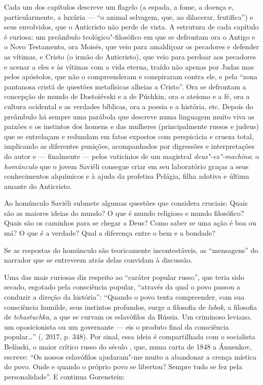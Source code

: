 Cada um dos capítulos descreve um flagelo (a espada, a fome, a doença e,
particularmente, a luxúria --- ``o animal selvagem, que, ao dilacerar,
frutifica'') e seus envolvidos, que o Anticristo não perde de vista. A
estrutura de cada capítulo é curiosa: um preâmbulo teológico"-filosófico
em que se defrontam ora o Antigo e o Novo Testamento, ora Moisés, que
veio para amaldiçoar os pecadores e defender as vítimas, e Cristo (o
irmão do Anticristo), que veio para perdoar aos pecadores e acenar a
eles e às vítimas com a vida eterna, traído não apenas por Judas mas
pelos apóstolos, que não o compreenderam e conspiraram contra ele, e pela
``zona pantanosa cristã de questões metafísicas alheias a Cristo''. Ora se
defrontam a concepção de mundo de Dostoiévski e a de Púchkin, ora o ateísmo e a fé,
ora a cultura ocidental e as verdades bíblicas, ora a poesia e a
história, etc. Depois do preâmbulo há sempre uma parábola que descreve
numa linguagem muito viva as paixões e os instintos dos homens e das
mulheres (principalmente russos e judeus) que se entrelaçam e redundam
em fatos expostos com perspicácia e crueza total, implicando as
diferentes punições, acompanhados por digressões e interpretações do
autor e --- finalmente --- pelos vaticínios de um magistral \emph{deus"-ex"-machina}:
o \emph{homúnculo} que o jovem Saviéli
consegue criar em seu laboratório graças a seus conhecimentos alquímicos
e à ajuda da profetisa Pelágia, filha adotiva e última amante do
Anticristo.

Ao homúnculo Saviéli submete algumas questões que considera cruciais: Quais são
as maiores ideias do mundo? O que é mundo religioso e mundo filosófico?
Quais são os caminhos para se chegar a Deus? Como saber se uma ação é
boa ou má? O que é a verdade? Qual a diferença entre o bem e a bondade?

Se as respostas do homúnculo são teoricamente incontestáveis, as
``mensagens'' do narrador que se entreveem atrás delas convidam à
discussão.

Uma das mais curiosas diz respeito ao ``caráter popular russo'', que
teria sido secado, esgotado pela consciência popular, ``através da qual
o povo passou a conduzir a direção da história'': ``Quando o povo tenta compreender,
com sua consciência humilde, seus instintos profundos,
surge a filosofia de \emph{lubok}, a filosofia de \emph{tchastuchka}, a que
se curvam os eslavófilos da Rússia. Um criminoso leviano,
um oposicionista ou um governante --- eis o produto final da consciência
popular\ldots{}'' (, 2017, p. 348). Por sinal, essa ideia 
é compartilhada com o socialista Belínski, o maior crítico russo 
do século , que, numa carta de 1848 a Ánnenkov, 
escreve: ``Os nossos eslavófilos ajudaram"-me muito a abandonar a
 crença mística do povo. Onde e quando o próprio povo se libertou?
 Sempre tudo se fez pela personalidade''. E continua Gorenstein:

